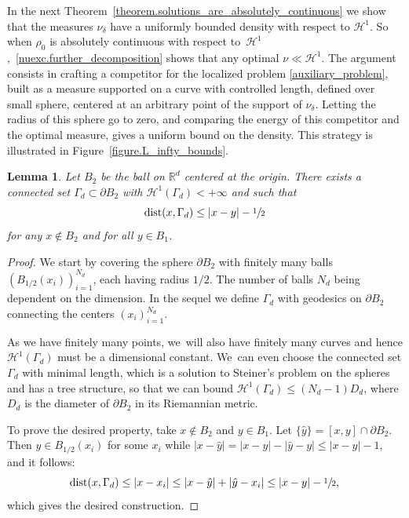 \documentclass[10pt]{amsart}
\newtheorem{lemma}[theorem]{Lemma}
\theoremstyle{definition}
\newcommand\cH{\mathcal{H}}
\newcommand{\RR}{\mathbb{R}}
\DeclareMathOperator{\dist}{dist}
\begin{document}
In the next Theorem~\ref{theorem.solutions_are_absolutely_continuous} we show that the measures $\nu_\delta$ have a uniformly
bounded density with respect to $\cH^1$. So when $\rho_0$ is absolutely continuous with respect to~$\cH^1$,~\eqref{nuexc.further_decomposition}
shows that any optimal $\nu \ll \cH^1$.
The argument consists in crafting a competitor for the
localized problem \eqref{auxiliary_problem}, built as a measure supported on a curve with controlled length, defined over small sphere, centered at an arbitrary point of the support of $\nu_\delta$. Letting the radius of this sphere go to zero, and comparing the energy of this competitor and the optimal measure, gives a uniform bound on the density.
This strategy is illustrated in Figure~\ref{figure.L_infty_bounds}.

\begin{lemma}\label{lemma.curve_on_B2}
Let $B_2$ be the ball on $\RR^d$ centered at the origin. There exists a connected set $\Gamma_d \subset \partial B_2$ with $\cH^1(\Gamma_d) < +\infty$ and such that\vspace*{-3pt}
\[
\dist(x, \Gamma_d) \le |x - y| - \sfrac{1}{2}
\]
for any $x \not\in B_2$ and for all $y \in B_1$.
\end{lemma}

\begin{proof}
We start by covering the sphere $\partial B_2$ with finitely many balls $\left(B_{1/2}(x_i)\right)_{i = 1}^{N_d}$, each having radius $1/2$. The number of balls $N_d$ being dependent on the dimension. In the sequel we define $\Gamma_d$ with geodesics on $\partial B_2$ connecting the centers $\left(x_i\right)_{i = 1}^{N_d}$.

As we have finitely many points, we~will also have finitely many curves and hence $\cH^1(\Gamma_d)$ must be a dimensional constant. We~can even choose the connected set $\Gamma_d$ with minimal length,
which is a solution to Steiner's problem on the spheres and has a tree structure,
so that we can bound $\cH^1(\Gamma_d) \le (N_d - 1)D_d$, where $D_d$ is the diameter of $\partial B_2$ in its Riemannian metric.

To prove the desired property, take $x \not\in B_2$ and $y \in B_1$. Let $\{\hat y\} = [x,y]\cap \partial B_2$. Then $\hat y \in B_{1/2}(x_i)$ for some $x_i$
while $|x-\hat y|=|x-y|-|\hat y-y|\le |x-y|-1$, and it follows:
\[
\dist(x, \Gamma_d)
\le |x - x_i|
\le |x - \hat y| + |\hat y - x_i|
\le |x - y| - \sfrac{1}{2},
\]
which gives the desired construction.
\end{proof}
\end{document}
